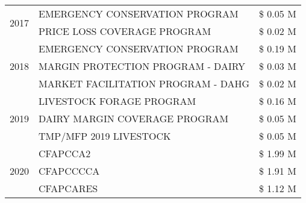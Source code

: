 \begin{tabular}{llr}
\cline{1-3}
\multirow[t]{2}{*}{2017} & EMERGENCY CONSERVATION PROGRAM & \$ 0.05 M \\
 & PRICE LOSS COVERAGE PROGRAM & \$ 0.02 M \\
\cline{1-3}
\multirow[t]{3}{*}{2018} & EMERGENCY CONSERVATION PROGRAM & \$ 0.19 M \\
 & MARGIN PROTECTION PROGRAM - DAIRY & \$ 0.03 M \\
 & MARKET FACILITATION PROGRAM - DAHG & \$ 0.02 M \\
\cline{1-3}
\multirow[t]{3}{*}{2019} & LIVESTOCK FORAGE PROGRAM & \$ 0.16 M \\
 & DAIRY MARGIN COVERAGE PROGRAM & \$ 0.05 M \\
 & TMP/MFP 2019 LIVESTOCK & \$ 0.05 M \\
\cline{1-3}
\multirow[t]{3}{*}{2020} & CFAPCCA2 & \$ 1.99 M \\
 & CFAPCCCCA & \$ 1.91 M \\
 & CFAPCARES & \$ 1.12 M \\
\cline{1-3}
\bottomrule
\end{tabular}
